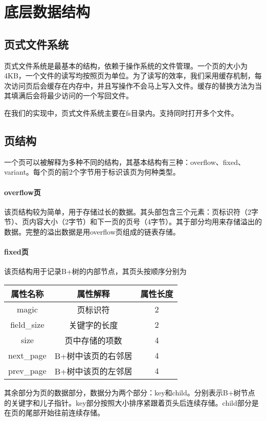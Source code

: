 \documentclass[10pt]{article}
\begin{document}
\section{底层数据结构}
\subsection{页式文件系统}
页式文件系统是最基本的结构，依赖于操作系统的文件管理。一个页的大小为4KB，一个文件的读写均按照页为单位。为了读写的效率，我们采用缓存机制，每次访问页后会缓存在内存中，并且写操作不会马上写入文件。缓存的替换方法为当其填满后会将最少访问的一个写回文件。

在我们的实现中，页式文件系统主要在fs目录内。支持同时打开多个文件。
\subsection{页结构}
一个页可以被解释为多种不同的结构，其基本结构有三种：overflow、fixed、variant。每个页的前2个字节用于标识该页为何种类型。

\paragraph{overflow页} 该页结构较为简单，用于存储过长的数据。其头部包含三个元素：页标识符（2字节）、页内容大小（2字节）和下一页的页号（4字节）。其于部分均用来存储溢出的数据。完整的溢出数据是用overflow页组成的链表存储。

\paragraph{fixed页} 该页结构用于记录B+树的内部节点，其页头按顺序分别为
\begin{table}[H]
	\centering
	\begin{tabular}{|c|c|c|} \hline
		\textbf{属性名称} & \textbf{属性解释} & \textbf{属性长度} \\ \hline
		magic & 页标识符 & 2 \\ \hline
		field\_size & 关键字的长度 & 2 \\ \hline
		size & 页中存储的项数 & 4 \\ \hline
		next\_page & B+树中该页的右邻居 & 4 \\ \hline
		prev\_page & B+树中该页的左邻居 & 4 \\ \hline
	\end{tabular}
\end{table}
其余部分为页的数据部分，数据分为两个部分：key和child。分别表示B+树节点的关键字和儿子指针。key部分按照大小排序紧跟着页头后连续存储。child部分是在页的尾部开始往前连续存储。
\end{document}
